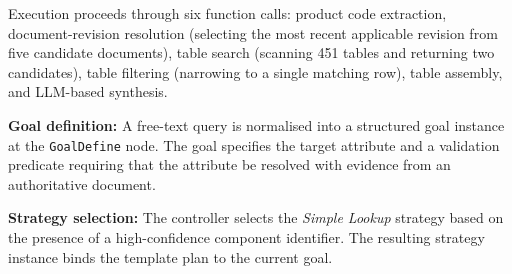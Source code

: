 \documentclass[largeformat]{interact}
\begin{document}
Execution proceeds through six function calls: product code extraction, document-revision resolution (selecting the most recent applicable revision from five candidate documents), table search (scanning 451 tables and returning two candidates), table filtering (narrowing to a single matching row), table assembly, and LLM-based synthesis.

\noindent \textbf{Goal definition:}
A free-text query is normalised into a structured goal instance at the \texttt{GoalDefine} node. The goal specifies the target attribute and a validation predicate requiring that the attribute be resolved with evidence from an authoritative document.

\noindent \textbf{Strategy selection:}
The controller selects the \emph{Simple Lookup} strategy based on the presence of a high-confidence component identifier. The resulting strategy instance binds the template plan to the current goal.
\end{document}
